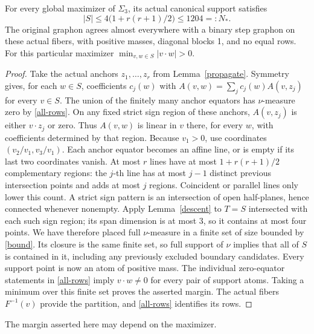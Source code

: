 \begin{theorem}\label{finite}
For every global maximizer of $\Sigma_3$, its actual canonical support satisfies
\begin{equation}
 |S|\le 4\bigl(1+r(r+1)/2\bigr)\le1204=:N_*. \label{bound}
\end{equation}
The original graphon agrees almost everywhere with a binary step graphon
on these actual fibers, with
positive masses, diagonal blocks 1, and no equal rows. For this particular
maximizer $\min_{v,w\in S}|v\cdot w|>0$.
\end{theorem}
\begin{proof}
Take the actual anchors $z_1,\ldots,z_r$ from Lemma~\ref{propagate}.
Symmetry gives, for each $w\in S$, coefficients $c_j(w)$ with
$A(v,w)=\sum_j c_j(w)A(v,z_j)$ for every $v\in S$.
The union of the finitely many anchor equators has $\nu$-measure zero by \eqref{all-rows}.
On any fixed strict sign region of these anchors,
$A(v,z_j)$ is either $v\cdot z_j$ or zero. Thus $A(v,w)$ is linear in $v$
there, for every $w$, with coefficients determined by that region.
Because $v_1>0$, use coordinates $(v_2/v_1,v_3/v_1)$.
Each anchor equator becomes an affine line, or is empty if its last two coordinates vanish.
At most $r$ lines have at most $1+r(r+1)/2$ complementary regions: the $j$-th
line has at most $j-1$ distinct previous intersection points and adds at most $j$ regions.
Coincident or parallel lines only lower this count. A strict sign pattern is an
intersection of open half-planes, hence connected whenever nonempty.
Apply Lemma~\ref{descent} to $T=S$ intersected with each such sign region;
its span dimension is at most 3, so it contains at most four points.
We have therefore placed full $\nu$-measure in a finite set of size bounded by \eqref{bound}.
Its closure is the same finite set, so full support of $\nu$ implies that all of $S$
is contained in it, including any previously excluded boundary candidates.
Every support point is now an atom of positive mass. The individual zero-equator
statements in \eqref{all-rows} imply $v\cdot w\ne0$ for every pair of support atoms.
Taking a minimum over this finite set proves the asserted margin.
The actual fibers $F^{-1}(v)$ provide the partition, and \eqref{all-rows} identifies its rows.
\end{proof}
The margin asserted here may depend on the maximizer.
